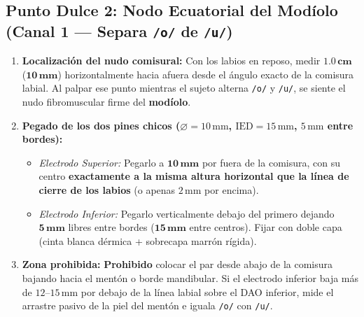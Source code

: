 \documentclass[11pt, a4paper]{article}
\begin{document}
\subsection{Punto Dulce 2: Nodo Ecuatorial del Modíolo (Canal 1 --- Separa \texttt{/o/} de \texttt{/u/})}
\begin{enumerate}\setlength{\itemsep}{2pt}
    \item \textbf{Localización del nudo comisural:} Con los labios en reposo, medir $\mathbf{1.0\,\text{cm}}$ ($\mathbf{10\,\text{mm}}$) horizontalmente hacia afuera desde el ángulo exacto de la comisura labial. Al palpar ese punto mientras el sujeto alterna \texttt{/o/} y \texttt{/u/}, se siente el nudo fibromuscular firme del \textbf{modíolo}.
    \item \textbf{Pegado de los dos pines chicos ($\varnothing = 10\,\text{mm}$, $\text{IED} = 15\,\text{mm}$, $5\,\text{mm}$ entre bordes):}
    \begin{itemize}\setlength{\itemsep}{1pt}
        \item \textit{Electrodo Superior:} Pegarlo a $\mathbf{10\,\text{mm}}$ por fuera de la comisura, con su centro \textbf{exactamente a la misma altura horizontal que la línea de cierre de los labios} (o apenas $2\,\text{mm}$ por encima).
        \item \textit{Electrodo Inferior:} Pegarlo verticalmente debajo del primero dejando $\mathbf{5\,\text{mm}}$ libres entre bordes ($\mathbf{15\,\text{mm}}$ entre centros). Fijar con doble capa (cinta blanca dérmica + sobrecapa marrón rígida).
    \end{itemize}
    \item \textbf{Zona prohibida:} \textbf{Prohibido} colocar el par desde abajo de la comisura bajando hacia el mentón o borde mandibular. Si el electrodo inferior baja más de $12\text{--}15\,\text{mm}$ por debajo de la línea labial sobre el DAO inferior, mide el arrastre pasivo de la piel del mentón e iguala \texttt{/o/} con \texttt{/u/}.
\end{enumerate}
\end{document}
